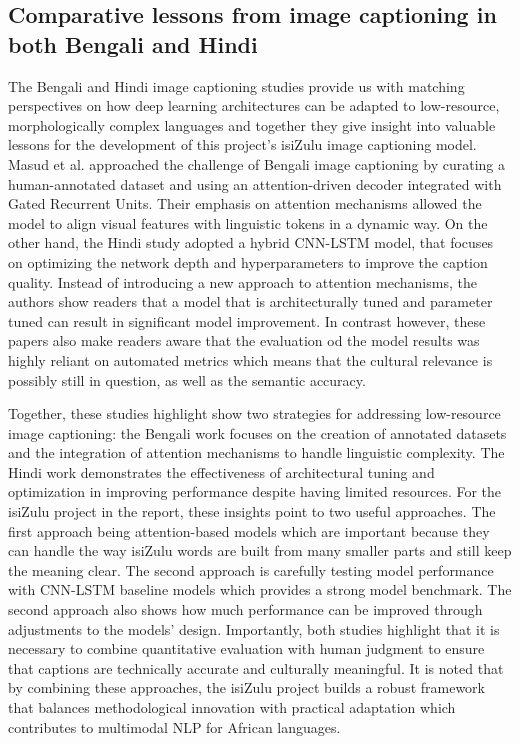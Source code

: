 \documentclass{article}
\begin{document}
\subsection{Comparative lessons from image captioning in both Bengali and Hindi}
The Bengali and Hindi image captioning studies provide us with matching perspectives on how deep learning architectures can be adapted to low-resource, morphologically complex languages and together they give insight into valuable lessons for the development of this project’s isiZulu image captioning model. Masud et al. approached the challenge of Bengali image captioning by curating a human-annotated dataset and using an attention-driven decoder integrated with Gated Recurrent Units\cite{masud2025image}. Their emphasis on attention mechanisms allowed the model to align visual features with linguistic tokens in a dynamic way. On the other hand, the Hindi study adopted a hybrid CNN-LSTM model, that focuses on optimizing the network depth and hyperparameters to improve the caption quality. Instead of introducing a new approach to attention mechanisms, the authors show readers that a model that is architecturally tuned and parameter tuned can result in significant model improvement. In contrast however, these papers also make readers aware that the evaluation od the model results was highly reliant on automated metrics which means that the cultural relevance is possibly still in question, as well as the semantic accuracy\cite{poddar2023hybrid}.

Together, these studies highlight show two strategies for addressing low-resource image captioning: the Bengali work focuses on the creation of annotated datasets and the integration of attention mechanisms to handle linguistic complexity. The Hindi work demonstrates the effectiveness of architectural tuning and optimization in improving performance despite having limited resources. For the isiZulu project in the report, these insights point to two useful approaches. The first approach being attention-based models which are important because they can handle the way isiZulu words are built from many smaller parts and still keep the meaning clear. The second approach is carefully testing model performance with CNN-LSTM baseline models which provides a strong model benchmark. The second approach also shows how much performance can be improved through adjustments to the models' design. Importantly, both studies highlight that it is necessary to combine quantitative evaluation with human judgment to ensure that captions are technically accurate and culturally meaningful. It is noted that by combining these approaches, the isiZulu project builds a robust framework that balances methodological innovation with practical adaptation which contributes to multimodal NLP for African languages.
\end{document}
